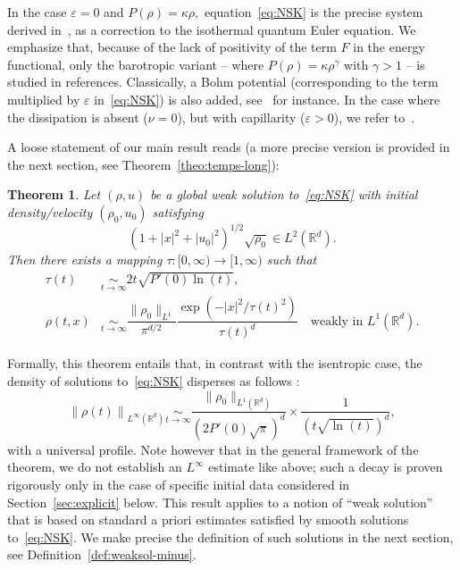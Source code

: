 \documentclass[11pt]{article}
\newtheorem{theo}{Theorem}[section]
\theoremstyle{definition}
\numberwithin{equation}{section}
\numberwithin{figure}{section}
\numberwithin{table}{section}
\newcommand*\R{\mathbb{R}}
\newcommand*\<{\left\langle}
\renewcommand*\>{\right\rangle}
\newcommand*\Eq[2]{\mathop{\sim}\limits_{#1\rightarrow#2}}
\newcommand*\eps{\varepsilon}
\begin{document}
In the case $\varepsilon =0$ and $P(\rho)= \kappa \rho,$ equation~\eqref{eq:NSK} is the precise system derived in~\cite{Bru-Me10}, as a correction to the isothermal quantum Euler equation. We emphasize that, because of the lack of positivity of the term $F$ in the energy functional, only the barotropic variant -- where $P(\rho) = \kappa\rho^{\gamma}$ with $\gamma >1$ -- is studied in references. Classically, a Bohm potential (corresponding to the term multiplied by $\varepsilon$ in~\eqref{eq:NSK}) is also added, see~\cite{AS-comp,Gis-VV15,Jungel,VasseurYu} for instance. In the case where the dissipation is absent ($\nu=0$), but with capillarity ($\eps>0$), we refer to~\cite{BDD07,AnMa09,AnMa12,AuHa17}.

A loose statement of our main result reads (a more precise version is provided in the next section, see Theorem~\ref{theo:temps-long}):

\begin{theo}\label{thm_mainrough}
Let $(\rho,u)$ be a global weak solution to~\eqref{eq:NSK} with initial density/velocity $(\rho_0,u_0)$ satisfying
\[
(1+|x|^2 +|u_0|^2)^{1/2} \sqrt{\rho_0}\in L^2(\mathbb R^d).
\]
Then there exists a mapping $\tau : [0,\infty) \to [1,\infty)$ such that
\begin{align*}
\tau(t) &\Eq t \infty 2t \sqrt{P'(0) \ln(t)}, \\
\rho(t, x) &\Eq t \infty \dfrac{\|\rho_0\|_{L^1}}{\pi^{d/2}}
\dfrac{\exp(-|x|^2/\tau(t)^2)}{\tau(t)^{d}}\quad
\text{weakly in }L^1(\R^d).
\end{align*}
\end{theo}

Formally, this theorem entails that, in contrast with the isentropic case, the density of solutions to~\eqref{eq:NSK} disperses as follows :
\begin{equation*}
\left\| \rho(t)\right\|_{L^\infty(\R^d)}\Eq t \infty
\frac{\|\rho_0\|_{L^1(\R^d)}}{\left(2P'(0)\sqrt{\pi}\right)^d}\times
\frac{1}{\left(t\sqrt{\ln(t)}\right)^d},
\end{equation*}
with a universal profile. Note however that in the general framework of the theorem, we do not establish an $L^\infty$ estimate like above; such a decay is proven rigorously only in the case of specific initial data considered in Section~\ref{sec:explicit} below. This result applies to a notion of ``weak solution'' that is based on standard a priori estimates satisfied by smooth solutions to~\eqref{eq:NSK}. We make precise the definition of such solutions in the next section, see Definition~\ref{def:weaksol-minus}.
\end{document}
